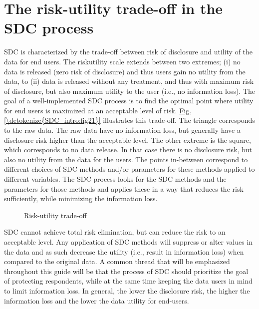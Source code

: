 \documentclass[letterpaper,10pt,english]{sphinxmanual}
\begin{document}
\section{The risk-utility trade-off in the SDC process}
\label{\detokenize{SDC_intro:the-risk-utility-trade-off-in-the-sdc-process}}
SDC is characterized by the trade-off between risk of disclosure and
utility of the data for end users. The risk\textendash{}utility scale extends
between two extremes; (i) no data is released (zero risk of disclosure)
and thus users gain no utility from the data, to (ii) data is released
without any treatment, and thus with maximum risk of disclosure, but
also maximum utility to the user (i.e., no information loss). The goal
of a well-implemented SDC process is to find the optimal point where
utility for end users is maximized at an acceptable level of risk.
\hyperref[\detokenize{SDC_intro:fig21}]{Fig.\@ \ref{\detokenize{SDC_intro:fig21}}} illustrates this trade-off. The triangle corresponds to the
raw data. The raw data have no information loss, but generally have a
disclosure risk higher than the acceptable level. The other extreme is
the square, which corresponds to no data release. In that case there is
no disclosure risk, but also no utility from the data for the users. The
points in-between correspond to different choices of SDC methods and/or
parameters for these methods applied to different variables. The SDC
process looks for the SDC methods and the parameters for those methods
and applies these in a way that reduces the risk sufficiently, while
minimizing the information loss.

\begin{figure}[htbp]
\centering
\capstart

\noindent{}
\caption{Risk-utility trade-off}\label{\detokenize{SDC_intro:fig21}}\label{\detokenize{SDC_intro:id2}}\end{figure}

SDC cannot achieve total risk elimination, but can reduce the risk to an
acceptable level. Any application of SDC methods will suppress or alter
values in the data and as such decrease the utility (i.e., result in
information loss) when compared to the original data. A common thread
that will be emphasized throughout this guide will be that the process
of SDC should prioritize the goal of protecting respondents, while at
the same time keeping the data users in mind to limit information loss.
In general, the lower the disclosure risk, the higher the information
loss and the lower the data utility for end-users.
\end{document}
